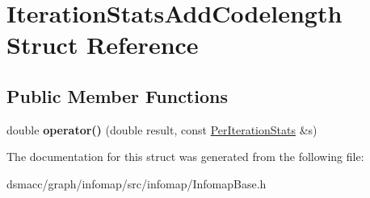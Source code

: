 \hypertarget{structIterationStatsAddCodelength}{}\section{Iteration\+Stats\+Add\+Codelength Struct Reference}
\label{structIterationStatsAddCodelength}
\subsection*{Public Member Functions}
\begin{DoxyCompactItemize}
\item 
\mbox{\label{structIterationStatsAddCodelength_aaa9f9274e721c86495fcb90dc5428464}} 
double {\bfseries operator()} (double result, const \mbox{\hyperlink{structPerIterationStats}{Per\+Iteration\+Stats}} \&s)
\end{DoxyCompactItemize}


The documentation for this struct was generated from the following file\+:\begin{DoxyCompactItemize}
\item 
dsmacc/graph/infomap/src/infomap/Infomap\+Base.\+h\end{DoxyCompactItemize}
